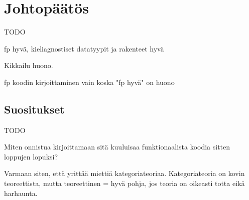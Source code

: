 \vspace{21.5pt}
\chapter{Johtopäätös}

TODO

fp hyvä, kieliagnostiset datatyypit ja rakenteet hyvä

Kikkailu huono.

fp koodin kirjoittaminen vain koska "fp hyvä" on huono

\section{Suositukset}

TODO

Miten onnistua kirjoittamaan sitä kuuluisaa funktionaalista koodia sitten loppujen lopuksi?

Varmaan siten, että yrittää miettiä kategoriateoriaa. Kategoriateoria on kovin teoreettista, mutta teoreettinen = hyvä pohja, jos teoria on oikeasti totta eikä harhaunta.
